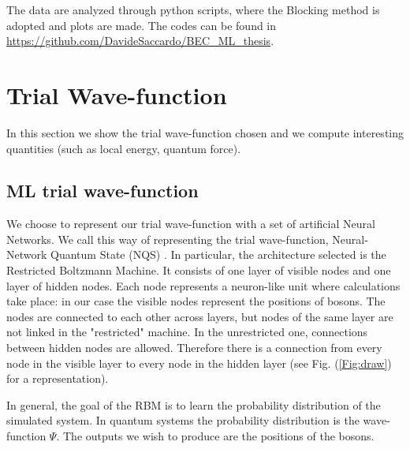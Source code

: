 The data are analyzed through python scripts, where the Blocking method is adopted and plots are made. The codes can be found in \url{https://github.com/DavideSaccardo/BEC_ML_thesis}.

\section{Trial Wave-function}
In this section we show the trial wave-function chosen %
and we compute interesting quantities (such as local energy, quantum force). 

\subsection{ML trial wave-function}
We choose to represent our trial wave-function with a set of artificial Neural Networks. We call this way of representing the trial wave-function, Neural-Network Quantum State (NQS) \cite{carleoSolvingQuantumManybody2017}. In particular, the architecture selected is the Restricted Boltzmann Machine. It consists of one layer of visible nodes and one layer of hidden nodes. Each node represents a neuron-like unit where calculations take place: in our case the visible nodes represent the positions of bosons. The nodes are connected to each other across layers, but nodes of the same layer are not linked in the "restricted" machine. In the unrestricted one, connections between hidden nodes are allowed. Therefore there is a connection from every node in the visible layer to every node in the hidden layer (see Fig. (\ref{Fig:draw}) for a representation). 

In general, the goal of the RBM is to learn the probability distribution of the simulated system. In quantum systems the probability distribution is the wave-function $\Psi$. The outputs we wish to produce are the positions of the bosons.  

